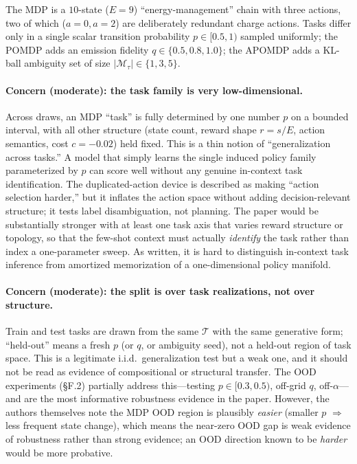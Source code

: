 \documentclass[11pt]{article}
\begin{document}
The MDP is a $10$-state ($E=9$) ``energy-management'' chain with three actions, two of which
($a=0,a=2$) are deliberately redundant charge actions. Tasks differ only in a single scalar
transition probability $p\in[0.5,1)$ sampled uniformly; the POMDP adds an emission fidelity
$q\in\{0.5,0.8,1.0\}$; the APOMDP adds a KL-ball ambiguity set of size $|\mathcal{M}_\tau|\in\{1,3,5\}$.

\paragraph{Concern (moderate): the task family is very low-dimensional.} Across draws, an
MDP ``task'' is fully determined by one number $p$ on a bounded interval, with all other
structure (state count, reward shape $r=s/E$, action semantics, cost $c=-0.02$) held fixed.
This is a thin notion of ``generalization across tasks.'' A model that simply learns the
single induced policy family parameterized by $p$ can score well without any genuine
in-context task identification. The duplicated-action device is described as making ``action
selection harder,'' but it inflates the action space without adding decision-relevant
structure; it tests label disambiguation, not planning. The paper would be substantially
stronger with at least one task axis that varies reward structure or topology, so that the
few-shot context must actually \emph{identify} the task rather than index a one-parameter
sweep. As written, it is hard to distinguish in-context task inference from amortized
memorization of a one-dimensional policy manifold.

\paragraph{Concern (moderate): the split is over task realizations, not over structure.}
Train and test tasks are drawn from the same $\mathcal{T}$ with the same generative form;
``held-out'' means a fresh $p$ (or $q$, or ambiguity seed), not a held-out region of task
space. This is a legitimate i.i.d.\ generalization test but a weak one, and it should not be
read as evidence of compositional or structural transfer. The OOD experiments
(\S F.2) partially address this---testing $p\in[0.3,0.5)$, off-grid $q$, off-$\alpha$---and
are the most informative robustness evidence in the paper. However, the authors themselves
note the MDP OOD region is plausibly \emph{easier} (smaller $p$ $\Rightarrow$ less frequent
state change), which means the near-zero OOD gap is weak evidence of robustness rather than
strong evidence; an OOD direction known to be \emph{harder} would be more probative.
\end{document}
